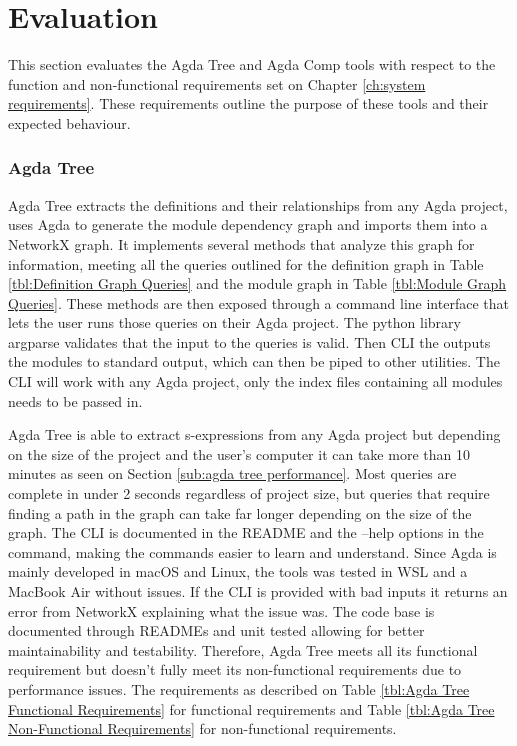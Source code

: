 
\chapter{Evaluation}

This section evaluates the Agda Tree and Agda Comp tools with respect to the
function and non-functional requirements set on Chapter \ref{ch:system
requirements}. These requirements outline the purpose of these tools and their
expected behaviour.

\subsection{Agda Tree} \label{sub:eval agda tree}

Agda Tree extracts the definitions and their relationships from any Agda
project, uses Agda to generate the module dependency graph and imports them
into a NetworkX graph. It implements several methods that analyze this
graph for information, meeting all the queries outlined for the definition
graph in Table \ref{tbl:Definition Graph Queries} and the module graph in Table
\ref{tbl:Module Graph Queries}. These methods are then exposed through a
command line interface that lets the user runs those queries on their Agda
project. The python library argparse validates that the input to the queries is
valid. Then CLI the outputs the modules to standard output, which can then be
piped to other utilities. The CLI will work with any Agda project, only the
index files containing all modules needs to be passed in. 

Agda Tree is able to extract s-expressions from any Agda project but depending
on the size of the project and the user's computer it can take more than 10
minutes as seen on Section \ref{sub:agda tree performance}. Most queries are
complete in under 2 seconds regardless of project size, but queries that
require finding a path in the graph can take far longer depending on the size
of the graph. The CLI is documented in the README and the \textsf{--help}
options in the command, making the commands easier to learn and understand.
Since Agda is mainly developed in macOS and Linux, the tools was tested in WSL
and a MacBook Air without issues. If the CLI is provided with bad inputs it
returns an error from NetworkX explaining what the issue was. The code base is
documented through READMEs and unit tested allowing for better maintainability
and testability. Therefore, Agda Tree meets all its functional requirement but
doesn't fully meet its non-functional requirements due to performance issues.
The requirements as described on Table \ref{tbl:Agda Tree Functional Requirements} for functional requirements and Table \ref{tbl:Agda Tree Non-Functional Requirements} for non-functional requirements.

